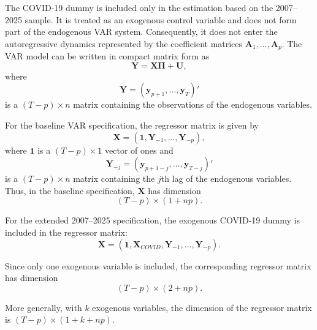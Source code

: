 \documentclass[12pt]{scrartcl}
\numberwithin{equation}{section}				%
\begin{document}
     The COVID-19 dummy is included only in the estimation based on the
     2007--2025 sample. It is treated as an exogenous control variable and does
     not form part of the endogenous VAR system. Consequently, it does not enter
     the autoregressive dynamics represented by the coefficient matrices
     $\mathbf{A}_1,\ldots,\mathbf{A}_p$.
     The VAR model can be written in compact matrix form as
     \begin{equation}
     	\mathbf{Y} = \mathbf{X}\mathbf{\Pi} + \mathbf{U}, \end{equation}
     where
     \begin{equation} \mathbf{Y} = \left( \mathbf{y}_{p+1}, \ldots,\mathbf{y}_{T}
     	\right)'\end{equation}
     is a $(T-p) \times n$ matrix containing the observations of the endogenous
     variables.
 
     For the baseline VAR specification, the regressor matrix is given by    
     \begin{equation}
     	\mathbf{X} = \left( \mathbf{1}, \mathbf{Y}_{-1}, \ldots, \mathbf{Y}_{-p}
     	\right),\end{equation}
     where $\mathbf{1}$ is a $(T-p) \times 1$ vector of ones and
     \begin{equation} \mathbf{Y}_{-j} = \left( \mathbf{y}_{p+1-j}, \ldots,
     	\mathbf{y}_{T-j} \right)'\end{equation}
     is a $(T-p) \times n$ matrix containing the $j$th lag of the endogenous
     variables. Thus, in the baseline specification, $\mathbf{X}$ has dimension
     \begin{equation} (T-p) \times (1+np).\end{equation}
     
     For the extended 2007--2025 specification, the exogenous COVID-19 dummy is
     included in the regressor matrix:
     \begin{equation}
     	\mathbf{X} = \left(\mathbf{1},\mathbf{X}_{COVID},\mathbf{Y}_{-1},\ldots,
     	\mathbf{Y}_{-p} \right).\end{equation}
     
     Since only one exogenous variable is included, the corresponding regressor
     matrix has dimension
     \begin{equation} (T-p) \times (2+np).\end{equation}
     
     More generally, with $k$ exogenous variables, the dimension of the regressor
     matrix is $(T-p) \times (1+k+np)$.
     
\end{document}
